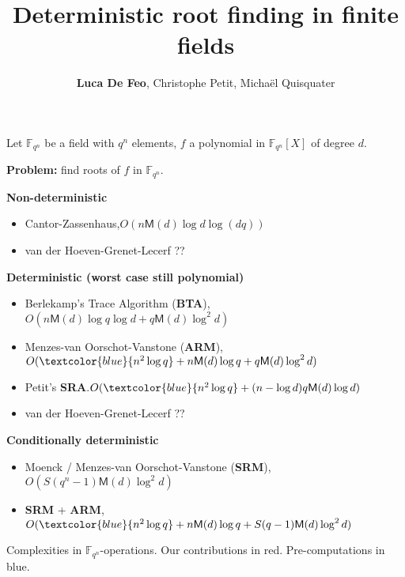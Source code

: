 \documentclass[aspectratio=169]{beamer}
\title{Deterministic root finding in finite fields}
\author{\textbf{Luca De Feo}, Christophe Petit, Micha\"el Quisquater}
\def\M {\ensuremath{\mathsf{M}}}
\def\F {\ensuremath{\mathbb{F}}}
\begin{document}
\begin{frame}
  Let $\F_{q^n}$ be a field with $q^n$ elements, $f$ a polynomial in
  $\F_{q^n}[X]$ of degree $d$.

  \smallskip
  \textbf{Problem:} find roots of $f$ in $\F_{q^n}$.

  \bigskip
  \textbf{Non-deterministic}
  \begin{itemize}
  \item Cantor-Zassenhaus,\hfill{$O(n\M(d)\log d\log(dq))$}
  \item van der Hoeven-Grenet-Lecerf \hfill{??}
  \end{itemize}

  \textbf{Deterministic (worst case still polynomial)}
  \begin{itemize}
  \item Berlekamp's Trace Algorithm (\textbf{BTA}),\hfill{$O(n\M(d)\log q\log d+q\M(d)\log^2d)$}
  \item Menzes-van Oorschot-Vanstone (\textbf{ARM}),\hfill{\color{alert}$O(\textcolor{blue}{n^2\log q}+n\M(d)\log q+q\M(d)\log^2d)$}
  \item {\color{alert}Petit's
    \textbf{SRA}}.\hfill{$O(\textcolor{blue}{n^2\log q}+(n-\log d)q\M(d)\log d)$}
  \item van der Hoeven-Grenet-Lecerf \hfill{??}
  \end{itemize}

  \textbf{Conditionally deterministic}
  \begin{itemize}
  \item Moenck / Menzes-van Oorschot-Vanstone 
    (\textbf{SRM}),\hfill{$O(S(q^n-1)\M(d)\log^2 d)$}
  \item \color{alert}\textbf{SRM} + \textbf{ARM},\hfill{$O(\textcolor{blue}{n^2\log q}+n\M(d)\log q+S(q-1)\M(d)\log^2d)$}
  \end{itemize}

  \smallskip Complexities in $\F_{q^n}$-operations. \color{alert}Our
  contributions in red. \color{blue}Pre-computations in blue.
\end{frame}
\end{document}
